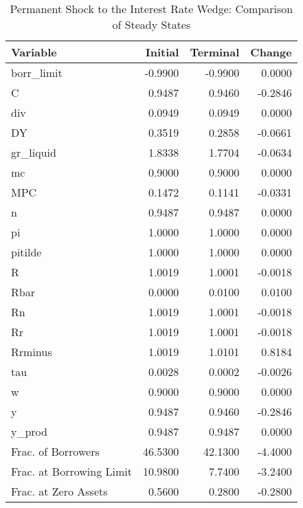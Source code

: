 \documentclass[12pt]{article} %
\numberwithin{equation}{section} %
\numberwithin{figure}{section}
\numberwithin{table}{section}
\begin{document}
\begin{table}[h]
\centering
\caption{Permanent Shock to the Interest Rate Wedge: Comparison of Steady States}
\label{tab:stst_Baseline_Wedge_Permanent}
\begin{tabular}{lrrr}
                Variable &  Initial &  Terminal &  Change \\
\hline
\hline
              borr\_limit &  -0.9900 &   -0.9900 &  0.0000 \\
                       C &   0.9487 &    0.9460 & -0.2846 \\
                     div &   0.0949 &    0.0949 &  0.0000 \\
                      DY &   0.3519 &    0.2858 & -0.0661 \\
               gr\_liquid &   1.8338 &    1.7704 & -0.0634 \\
                      mc &   0.9000 &    0.9000 &  0.0000 \\
                     MPC &   0.1472 &    0.1141 & -0.0331 \\
                       n &   0.9487 &    0.9487 &  0.0000 \\
                      pi &   1.0000 &    1.0000 &  0.0000 \\
                 pitilde &   1.0000 &    1.0000 &  0.0000 \\
                       R &   1.0019 &    1.0001 & -0.0018 \\
                    Rbar &   0.0000 &    0.0100 &  0.0100 \\
                      Rn &   1.0019 &    1.0001 & -0.0018 \\
                      Rr &   1.0019 &    1.0001 & -0.0018 \\
                 Rrminus &   1.0019 &    1.0101 &  0.8184 \\
                     tau &   0.0028 &    0.0002 & -0.0026 \\
                       w &   0.9000 &    0.9000 &  0.0000 \\
                       y &   0.9487 &    0.9460 & -0.2846 \\
                  y\_prod &   0.9487 &    0.9487 &  0.0000 \\
      Frac. of Borrowers &  46.5300 &   42.1300 & -4.4000 \\
Frac. at Borrowing Limit &  10.9800 &    7.7400 & -3.2400 \\
    Frac. at Zero Assets &   0.5600 &    0.2800 & -0.2800 \\
\hline
\end{tabular}
\end{table}
\end{document}
